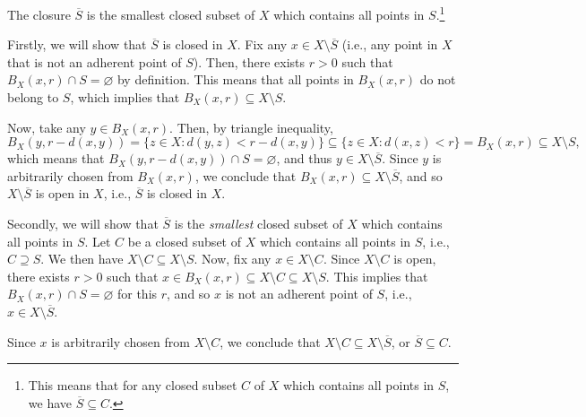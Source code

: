\begin{enumerate}
\begin{theorem}
\label{thm:closure-smallest-closed}
The closure \(\overline{S}\) is the smallest closed subset of \(X\) which
contains all points in \(S\).\footnote{This means that for any closed subset
\(C\) of \(X\) which contains all points in \(S\), we have
\(\overline{S}\subseteq C\).}
\end{theorem}
\begin{pf}
Firstly, we will show that \(\overline{S}\) is closed in \(X\). Fix any \(x\in
X\setminus\overline{S}\) (i.e., any point in \(X\) that is not an adherent
point of \(S\)). Then, there exists \(r>0\) such that \(B_X(x,r)\cap
S=\varnothing\) by definition. This means that all points in \(B_X(x,r)\) do
not belong to \(S\), which implies that \(B_X(x,r)\subseteq X\setminus S\).

Now, take any \(y\in B_X(x,r)\). Then, by triangle inequality,
\[
B_X(y,r-d(x,y))=\{z\in X:d(y,z)<r-d(x,y)\}\subseteq \{z\in X:d(x,z)<r\}=B_X(x,r)\subseteq X\setminus S,
\]
which means that \(B_X(y,r-d(x,y))\cap S=\varnothing\), and thus \(y\in
X\setminus\overline{S}\). Since \(y\) is arbitrarily chosen from \(B_X(x,r)\),
we conclude that \(B_X(x,r)\subseteq X\setminus \overline{S}\), and so
\(X\setminus\overline{S}\) is open in \(X\), i.e., \(\overline{S}\) is closed
in \(X\).

Secondly, we will show that \(\overline{S}\) is the \emph{smallest} closed
subset of \(X\) which contains all points in \(S\). Let \(C\) be a closed
subset of \(X\) which contains all points in \(S\), i.e., \(C\supseteq S\). We
then have \(X\setminus C\subseteq X\setminus S\). Now, fix any \(x\in
X\setminus C\). Since \(X\setminus C\) is open, there exists \(r>0\) such that
\(x\in B_X(x,r)\subseteq X\setminus C\subseteq X\setminus S\). This implies
that \(B_X(x,r)\cap S=\varnothing\) for this \(r\), and so \(x\) is not an
adherent point of \(S\), i.e., \(x\in X\setminus\overline{S}\).

Since \(x\) is arbitrarily chosen from \(X\setminus C\), we conclude that
\(X\setminus C\subseteq X\setminus\overline{S}\), or \(\overline{S}\subseteq
C\).
\end{pf}


\end{enumerate}
